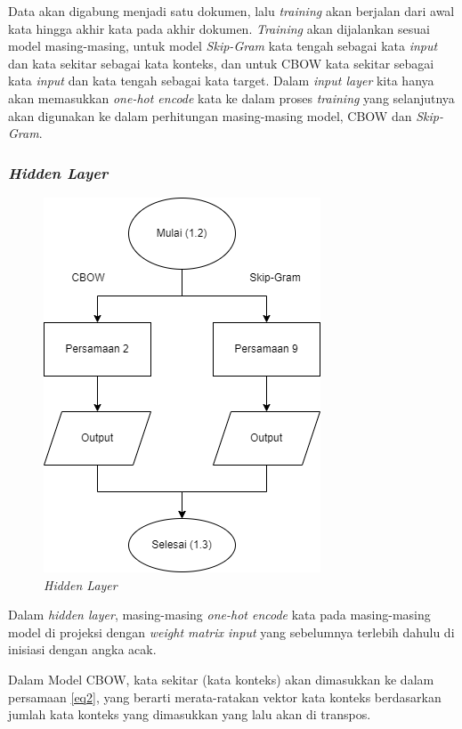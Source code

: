 \documentclass[12pt]{report}
\begin{document}
Data akan digabung menjadi satu dokumen, lalu \textit{training} akan berjalan dari awal kata hingga akhir kata pada akhir dokumen. \textit{Training} akan dijalankan sesuai model masing-masing, untuk model \textit{Skip-Gram} kata tengah sebagai kata \textit{input} dan kata sekitar sebagai kata konteks, dan untuk CBOW kata sekitar sebagai kata \textit{input} dan kata tengah sebagai kata target. Dalam \textit{input layer} kita hanya akan memasukkan \textit{one-hot encode} kata ke dalam proses \textit{training} yang selanjutnya akan digunakan ke dalam perhitungan masing-masing model, CBOW dan \textit{Skip-Gram}.

\subsubsection{\textit{Hidden Layer}}
\begin{figure}[H]
\centering
\includegraphics[scale=0.8]{hiddenlayerrev3}
\caption{\textit{Hidden Layer}}
\label{hiddenlayer}
\end{figure}
Dalam \textit{hidden layer}, masing-masing \textit{one-hot encode} kata pada masing-masing model di projeksi dengan \textit{weight matrix input} yang sebelumnya terlebih dahulu di inisiasi dengan angka acak. 

Dalam Model CBOW, kata sekitar (kata konteks) akan dimasukkan ke dalam persamaan \eqref{eq2}, yang berarti merata-ratakan vektor kata konteks berdasarkan jumlah kata konteks yang dimasukkan yang lalu akan di transpos. 
\end{document}
